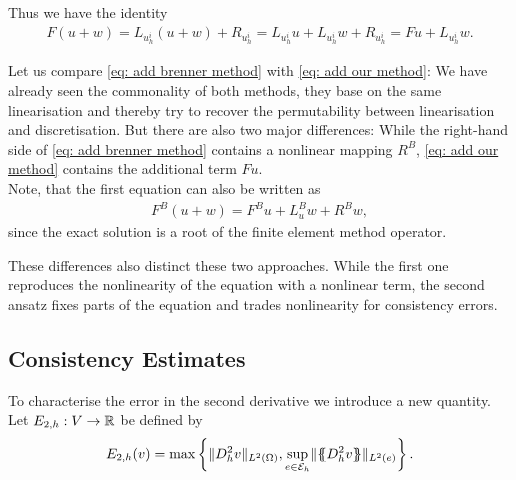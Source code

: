 Thus we have the identity 
\begin{align}
	F(u+w) = L_{u^i_h} (u+w) + R_{u^i_h} = L_{u^i_h} u +L_{u^i_h}w + R_{u^i_h} = Fu + L_{u^i_h}w. \label{eq: add our method}
\end{align}

Let us compare \eqref{eq: add brenner method} with \eqref{eq: add our method}: We have already seen the commonality of both methods, they base on the same linearisation and thereby try to recover the permutability between linearisation and discretisation. 
But there are also two major differences: While the right-hand side of \eqref{eq: add brenner method} contains a nonlinear mapping $R^B$, \eqref{eq: add our method} contains the additional term $Fu$. \\
Note, that the first equation can also be written as 
 \begin{align*}
 F^B(u +w ) = F^B u + L^B_u w + R^Bw,
 \end{align*}
since the exact \MA solution is a root of the finite element method operator. 

These differences also distinct these two approaches. While the first one reproduces the nonlinearity of the \MA equation with a nonlinear term, the second ansatz fixes parts of the equation and trades nonlinearity for consistency errors.

\subsection{Consistency Estimates}

To characterise the error in the second derivative we introduce a new quantity. Let $E_{2,h}:V \rightarrow \mathbb{R}$ be defined by
\[
	E_{2,h}(v) = \operatorname{max} \left\{  \lVert D_h^2 v \rVert_{L^2(\Omega)},  \sup_{e \in \mathcal{E}_h} \lVert \{\!\!\{ D_h^2 v \}\!\!\} \rVert_{L^2(e)} \right\} .
\]	

